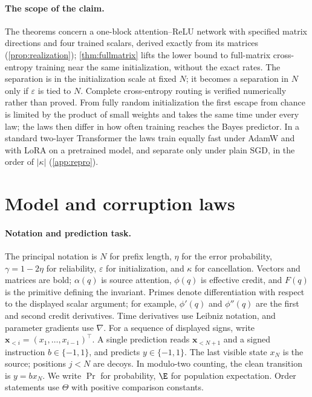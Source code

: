 \paragraph{The scope of the claim.} The theorems concern a one-block attention--ReLU network with specified matrix directions and four trained scalars,
derived exactly from its matrices (\cref{prop:realization}); \cref{thm:fullmatrix} lifts the lower bound to full-matrix cross-entropy training near the same initialization,
without the exact rates. The separation is in the initialization scale at fixed $N$; it becomes a separation in $N$ only if
$\varepsilon$ is tied to $N$. Complete cross-entropy routing is verified numerically rather than proved. From fully random initialization the first escape from chance
is limited by the product of small weights and takes the same time under every law; the laws then differ in how often training reaches the Bayes predictor.
In a standard two-layer Transformer the laws train equally fast under AdamW and with LoRA on a pretrained model, and separate only under
plain SGD, in the order of $|\kappa|$ (\cref{app:repro}).

\section{Model and corruption laws}
\label{sec:setup}
\paragraph{Notation and prediction task.}
The principal notation is $N$ for prefix length, $\eta$ for the error probability,
$\gamma=1-2\eta$ for reliability, $\varepsilon$ for initialization, and $\kappa$ for cancellation.
Vectors and matrices are bold; $\alpha(q)$ is source attention, $\phi(q)$ is effective credit,
and $F(q)$ is the primitive defining the invariant.
Primes denote differentiation with respect to the displayed scalar argument;
for example, $\phi'(q)$ and $\phi''(q)$ are the first and second credit derivatives.
Time derivatives use Leibniz notation, and parameter gradients use $\nabla$.
For a sequence of displayed signs, write $\bm x_{<i}=(x_1,\ldots,x_{i-1})^\top$.
A single prediction reads $\bm x_{<N+1}$ and a signed instruction $b\in\{-1,1\}$, and predicts $y\in\{-1,1\}$.
The last visible state $x_N$ is the source; positions $j<N$ are decoys.
In modulo-two counting, the clean transition is $y=b x_N$.
We write $\Pr$ for probability, $\E$ for population expectation.
Order statements use $\Theta$ with positive comparison constants.

